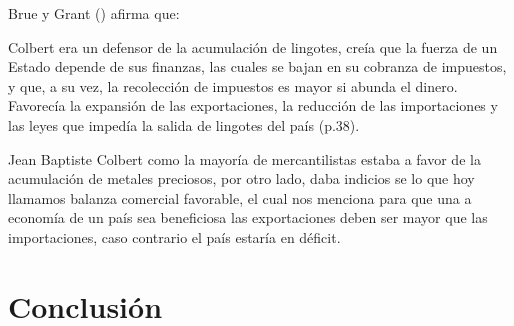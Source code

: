 \documentclass[
  stu,
  floatsintext,
  longtable,
  a4paper,
  nolmodern,
  notxfonts,
  notimes,
  12pt,
  colorlinks=true,linkcolor=blue,citecolor=blue,urlcolor=blue]{apa7}
\begin{document}
Brue y Grant ()
afirma que:

Colbert era un defensor de la acumulación de lingotes, creía que la
fuerza de un Estado depende de sus finanzas, las cuales se bajan en su
cobranza de impuestos, y que, a su vez, la recolección de impuestos es
mayor si abunda el dinero. Favorecía la expansión de las exportaciones,
la reducción de las importaciones y las leyes que impedía la salida de
lingotes del país (p.38).

Jean Baptiste Colbert como la mayoría de mercantilistas estaba a favor
de la acumulación de metales preciosos, por otro lado, daba indicios se
lo que hoy llamamos balanza comercial favorable, el cual nos menciona
para que una a economía de un país sea beneficiosa las exportaciones
deben ser mayor que las importaciones, caso contrario el país estaría en
déficit.

\section{Conclusión}\label{conclusiuxf3n}
\end{document}
